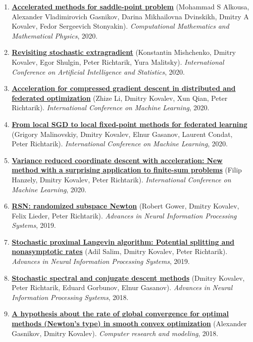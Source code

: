 \begin{enumerate}
\item
\textbf{\href{https://link.springer.com/article/10.1134/S0965542520110020}{Accelerated methods for saddle-point problem}} (Mohammad S Alkousa, Alexander Vladimirovich Gasnikov, Darina Mikhailovna Dvinskikh, Dmitry A Kovalev, Fedor Sergeevich Stonyakin). \textit{Computational Mathematics and Mathematical Physics}, 2020.
\item
\textbf{\href{http://proceedings.mlr.press/v108/mishchenko20a}{Revisiting stochastic extragradient}} (Konstantin Mishchenko, Dmitry Kovalev, Egor Shulgin, Peter Richtarik, Yura Malitsky). \textit{International Conference on Artificial Intelligence and Statistics}, 2020.
\item
\textbf{\href{https://proceedings.mlr.press/v119/li20g.html}{Acceleration for compressed gradient descent in distributed and federated optimization}} (Zhize Li, Dmitry Kovalev, Xun Qian, Peter Richtarik). \textit{International Conference on Machine Learning}, 2020.
\item
\textbf{\href{http://proceedings.mlr.press/v119/malinovskiy20a.html}{From local SGD to local fixed-point methods for federated learning}} (Grigory Malinovskiy, Dmitry Kovalev, Elnur Gasanov, Laurent Condat, Peter Richtarik). \textit{International Conference on Machine Learning}, 2020.
\item
\textbf{\href{https://proceedings.mlr.press/v119/hanzely20b.html}{Variance reduced coordinate descent with acceleration: New method with a surprising application to finite-sum problems}} (Filip Hanzely, Dmitry Kovalev, Peter Richtarik). \textit{International Conference on Machine Learning}, 2020.
\item
\textbf{\href{https://proceedings.neurips.cc/paper/2019/hash/bc6dc48b743dc5d013b1abaebd2faed2-Abstract.html}{RSN: randomized subspace Newton}} (Robert Gower, Dmitry Kovalev, Felix Lieder, Peter Richtarik). \textit{Advances in Neural Information Processing Systems}, 2019.
\item
\textbf{\href{https://proceedings.neurips.cc/paper/2019/hash/6a8018b3a00b69c008601b8becae392b-Abstract.html}{Stochastic proximal Langevin algorithm: Potential splitting and nonasymptotic rates}} (Adil Salim, Dmitry Kovalev, Peter Richtarik). \textit{Advances in Neural Information Processing Systems}, 2019.
\item
\textbf{\href{https://proceedings.neurips.cc/paper_files/paper/2018/hash/e721a54a8cf18c8543d44782d9ef681f-Abstract.html}{Stochastic spectral and conjugate descent methods}} (Dmitry Kovalev, Peter Richtarik, Eduard Gorbunov, Elnur Gasanov). \textit{Advances in Neural Information Processing Systems}, 2018.
\item
\textbf{\href{http://crm-en.ics.org.ru/journal/article/2685/}{A hypothesis about the rate of global convergence for optimal methods (Newton’s type) in smooth convex optimization}} (Alexander Gasnikov, Dmitry Kovalev). \textit{Computer research and modeling}, 2018.
\end{enumerate}
